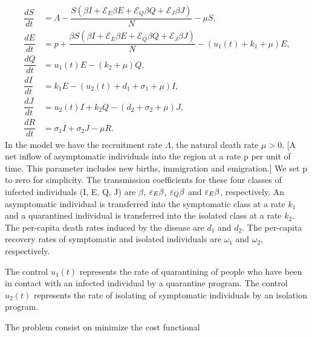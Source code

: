     \begin{equation}\label{eqn:sars_model}
    	\begin{aligned}
    		\dfrac{dS}{dt} &= \Lambda -\dfrac{S \left( \beta I + \mathcal{E}_E  \beta E
    		                + \mathcal{E}_Q  \beta Q + \mathcal{E}_J  \beta J \right)}{N}
    		                - \mu S, \\
    		\dfrac{dE}{dt} &= p + \dfrac{ \beta S \left( \beta I + \mathcal{E}_E \beta E
    						+ \mathcal{E}_Q \beta Q + \mathcal{E}_J \beta J\right)}{N}
    			            -(u_1(t) + k_1 + \mu)E,\\
    		\dfrac{dQ}{dt} &= u_1(t) E - (k_2 + \mu) Q, \\
    		\dfrac{dI}{dt} &= k_1 E -(u_2(t) + d_1  + \sigma_1 + \mu) I, \\
    		\dfrac{dJ}{dt} &= u_2(t) I + k_2 Q - (d_2 + \sigma_2 + \mu) J, \\
    		\dfrac{dR}{dt} &= \sigma_1 I +\sigma_2 J - \mu R.
    	\end{aligned}
    \end{equation}
    In the model we have the recruitment rate $\Lambda$, the natural death 
    rate $\mu >0$. [A net inflow of asymptomatic individuals into the region 
    at a rate p per unit of time. This parameter includes new births, immigration 
    and emigration.] We set p to zero for simplicity. The transmission coefficients 
    for these four classes of infected individuals (I, E, Q, J) are $\beta$,
    $\varepsilon_{E}\beta$, $\varepsilon_{Q}\beta$  and $\varepsilon_{E}\beta$, respectively.
    An asymptomatic individual is transferred into the symptomatic class at a rate
    $k_1$ and a quarantined individual is transferred into the isolated class at
    a rate $k_2$. The per-capita death rates induced by the disease are $d_1$ and
    $d_2$. The per-capita recovery rates of symptomatic and isolated individuals 
    are $\omega_1$ and $\omega_2$, respectively.
    
    The control $u_1 (t)$ represents the rate of quarantining of people who have
    been in contact with an infected individual by a quarantine program. 
    The control $u_2(t)$ represents the rate of isolating of symptomatic individuals 
    by an isolation program.
    
    The problem consist on minimize the cost functional

